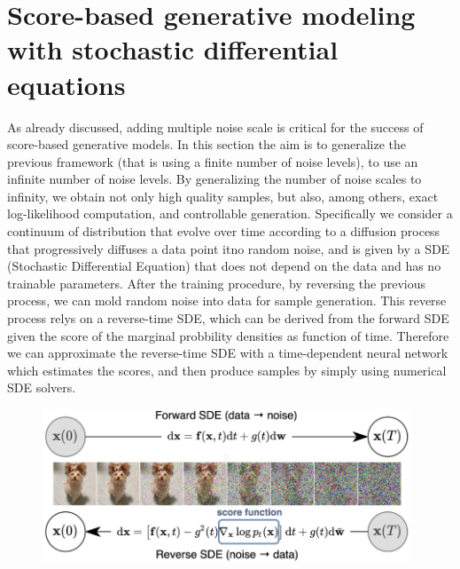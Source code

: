 \documentclass{article}
\begin{document}
     \section{Score-based generative modeling with stochastic differential equations}
     As already discussed, adding multiple noise scale is critical for the success of score-based generative models. In this section the aim is to generalize the previous framework (that is using a finite number of noise levels), to use an infinite number of noise levels. By generalizing the number of noise scales to infinity, we obtain not only high quality samples, but also, among others, exact log-likelihood computation, and controllable generation. Specifically we consider a continuum of distribution that evolve over time according to a diffusion process that progressively diffuses a data point itno random noise, and is given by a SDE (Stochastic Differential Equation) that does not depend on the data and has no trainable parameters. After the training procedure, by reversing the previous process, we can mold random noise into data for sample generation. This reverse process relys on a reverse-time SDE, which can be derived from the forward SDE given the score of the marginal probbility densities as function of time. Therefore we can approximate the reverse-time SDE with a time-dependent neural network which estimates the scores, and then produce samples by simply using numerical SDE solvers.\\
      \begin{figure}[h]
	  	\includegraphics[width=11cm]{SDEmodel}
	  	\centering
	  \end{figure}
\end{document}
